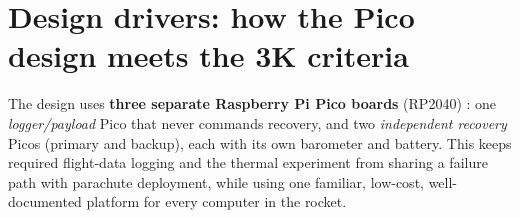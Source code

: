 \section{Design drivers: how the Pico design meets the 3K criteria}
The design uses \textbf{three separate Raspberry Pi Pico boards} (RP2040) \cite{picods,rp2040ds}: one \emph{logger/payload} Pico that never commands recovery, and two \emph{independent recovery} Picos (primary and backup), each with its own barometer and battery. This keeps required flight-data logging and the thermal experiment from sharing a failure path with parachute deployment, while using one familiar, low-cost, well-documented platform for every computer in the rocket.

